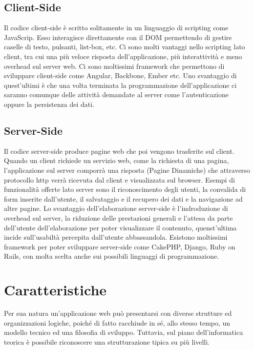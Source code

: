 	  \subsection{Client-Side}
	  Il codice client-side è scritto solitamente in un linguaggio di scripting come JavaScrip. Esso 
	  interagisce direttamente con il DOM permettendo di gestire caselle di testo, pulsanti, 
	  list-box, etc.
	  Ci sono molti vantaggi nello scripting lato client,
	  tra cui una più veloce risposta dell'applicazione, più interattività e meno overhead sul server web.
	  Ci sono moltissimi framework che permettono di sviluppare client-side come Angular, Backbone, Ember etc.
	  Uno svantaggio di quest'ultimi è che una volta terminata la programmazione dell'applicazione ci saranno comunque delle attività 
	  demandate al server come l'autenticazione oppure la persistenza dei dati.
	  \subsection{Server-Side}
	  Il codice server-side produce pagine web che poi vengono trasferite sul client.
	  Quando un client richiede un servizio web, come la richiesta di una pagina, l'applicazione
	  sul server comporrà una risposta (Pagine Dinamiche) che attraverso protocollo http verrà ricevuta dal client e 
	  visualizzata sul browser.
	  Esempi di funzionalità offerte lato server sono il riconoscimento degli utenti, 
	  la convalida di form inserite dall'utente,
	  il salvataggio e il recupero dei dati e la navigazione ad altre pagine.
	  Lo svantaggio dell'elaborazione server-side è l'indroduzione di overhead sul server, la riduzione
	  delle prestazioni generali e l'attesa da parte dell'utente dell'elaborazione per poter 
	  visualizzare il contenuto, quenst'ultima incide sull'usabiltà percepita dall'utente abbassandola.
	  Esistono moltissimi framework per poter sviluppare server-side come CakePHP, Django, Ruby on Rails, con 
	  molta scelta anche sui possibili linguaggi di programmazione.
	 
\section{Caratteristiche}
	  Per sua natura un'applicazione web può presentarsi con diverse strutture ed organizzazioni
	  logiche, poiché di fatto racchiude in sé, allo stesso tempo, un modello tecnico ed una filosofia di sviluppo.
	  Tuttavia, sul piano dell'informatica teorica è possibile riconoscere una strutturazione tipica su più livelli.
